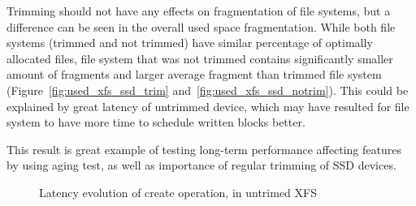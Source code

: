 \documentclass[
  color, %
  table, %
  lof,   %
  lot,   %
]{fithesis3}
\begin{document}
Trimming should not have any effects on fragmentation of file systems, but a difference can be seen in the overall used space fragmentation. While both file systems (trimmed and not trimmed) have similar percentage of optimally allocated files, file system that was not trimmed contains significantly smaller amount of fragments and larger average fragment than trimmed file system (Figure~\ref{fig:used_xfs_ssd_trim} and~\ref{fig:used_xfs_ssd_notrim}). This could be explained by great latency of untrimmed device, which may have resulted for file system to have more time to schedule written blocks better.

This result is great example of testing long-term performance affecting features by using aging test, as well as importance of regular trimming of SSD devices.


\begin{figure}
    \centering
    \caption[Evolution of latency of create operation, in untrimed file system (XFS)]{Latency evolution of create operation, in untrimed XFS}
    \label{fig:notrim_create}
\end{figure}
\end{document}
